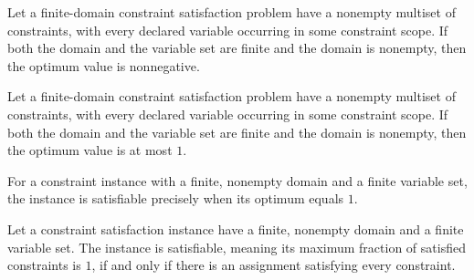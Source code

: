 \begin{theorem}
\label{FABL.CSPInstance.optimum_nonneg}
\leanok
{}
Let a finite-domain constraint satisfaction problem have a nonempty multiset of
constraints, with every declared variable occurring in some constraint scope. If both
the domain and the variable set are finite and the domain is nonempty, then the optimum
value is nonnegative.
\end{theorem}

\begin{theorem}
\label{FABL.CSPInstance.optimum_le_one}
\leanok
{}
Let a finite-domain constraint satisfaction problem have a nonempty multiset of
constraints, with every declared variable occurring in some constraint scope. If both
the domain and the variable set are finite and the domain is nonempty, then the optimum
value is at most $1$.
\end{theorem}

\begin{definition}
\label{FABL.CSPInstance.Satisfiable}
\leanok
{}
For a constraint instance with a finite, nonempty domain and a finite variable set, the
instance is satisfiable precisely when its optimum equals $1$.
\end{definition}

\begin{theorem}
\label{FABL.CSPInstance.satisfiable_iff_exists_fullySatisfied}
\leanok
{}
Let a constraint satisfaction instance have a finite, nonempty domain and a finite
variable set. The instance is satisfiable, meaning its maximum fraction of satisfied
constraints is $1$, if and only if there is an assignment satisfying every constraint.
\end{theorem}

